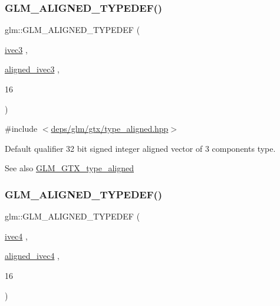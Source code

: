 \subsubsection{\texorpdfstring{G\+L\+M\+\_\+\+A\+L\+I\+G\+N\+E\+D\+\_\+\+T\+Y\+P\+E\+D\+E\+F()}{GLM\_ALIGNED\_TYPEDEF()}\hspace{0.1cm}{\footnotesize\ttfamily [51/209]}}
{\footnotesize\ttfamily glm\+::\+G\+L\+M\+\_\+\+A\+L\+I\+G\+N\+E\+D\+\_\+\+T\+Y\+P\+E\+D\+EF (\begin{DoxyParamCaption}\item[{\hyperlink{group__core__types_ga6e12a4ca00d696f07da1df4eb73e0fe8}{ivec3}}]{,  }\item[{\hyperlink{group__gtc__type__aligned_gabbf85e492d39baef3a418c15c996ab65}{aligned\+\_\+ivec3}}]{,  }\item[{16}]{ }\end{DoxyParamCaption})}



{\ttfamily \#include $<$\hyperlink{gtx_2type__aligned_8hpp}{deps/glm/gtx/type\+\_\+aligned.\+hpp}$>$}

Default qualifier 32 bit signed integer aligned vector of 3 components type. \begin{DoxySeeAlso}{See also}
\hyperlink{group__gtx__type__aligned}{G\+L\+M\+\_\+\+G\+T\+X\+\_\+type\+\_\+aligned} 
\end{DoxySeeAlso}
\mbox{\label{group__gtx__type__aligned_ga50d8a9523968c77f8325b4c9bfbff41e}} 
\subsubsection{\texorpdfstring{G\+L\+M\+\_\+\+A\+L\+I\+G\+N\+E\+D\+\_\+\+T\+Y\+P\+E\+D\+E\+F()}{GLM\_ALIGNED\_TYPEDEF()}\hspace{0.1cm}{\footnotesize\ttfamily [52/209]}}
{\footnotesize\ttfamily glm\+::\+G\+L\+M\+\_\+\+A\+L\+I\+G\+N\+E\+D\+\_\+\+T\+Y\+P\+E\+D\+EF (\begin{DoxyParamCaption}\item[{\hyperlink{group__core__types_gaa4560ddc50320ea8f8a70d5c9c249fea}{ivec4}}]{,  }\item[{\hyperlink{group__gtc__type__aligned_gaa33169a30c7d22a8648f20b4534f635f}{aligned\+\_\+ivec4}}]{,  }\item[{16}]{ }\end{DoxyParamCaption})}



